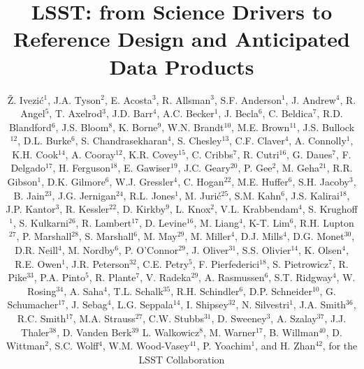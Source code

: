 \documentclass{emulateapj}
\begin{document}
\title{LSST: from Science Drivers to Reference Design and Anticipated Data Products} 

\author{
\v{Z}. Ivezi\'{c}$^1$,
J.A. Tyson$^2$,
E. Acosta$^3$,
R. Allsman$^3$,
S.F. Anderson$^1$,
J. Andrew$^4$,
R. Angel$^5$,
T. Axelrod$^3$,
J.D. Barr$^4$,
A.C. Becker$^1$, 
J. Becla$^6$,  
C. Beldica$^7$,
R.D. Blandford$^6$,
J.S. Bloom$^8$, 
K. Borne$^9$,  
W.N. Brandt$^{10}$,
M.E. Brown$^{11}$,   
J.S. Bullock$^{12}$,   
D.L. Burke$^6$, 
S. Chandrasekharan$^4$,
S. Chesley$^{13}$, 
C.F. Claver$^4$,   
A. Connolly$^1$,
K.H. Cook$^{14}$,
A. Cooray$^{12}$, 
K.R. Covey$^{15}$,    
C. Cribbs$^7$,
R. Cutri$^{16}$,
G. Daues$^7$,
F. Delgado$^{17}$,
H. Ferguson$^{18}$,
E. Gawiser$^{19}$,   
J.C. Geary$^{20}$,
P. Gee$^2$,
M. Geha$^{21}$,
R.R. Gibson$^1$,    
D.K. Gilmore$^6$,     
W.J. Gressler$^4$,
C. Hogan$^{22}$, 
M.E. Huffer$^6$,
S.H. Jacoby$^3$,  
B. Jain$^{23}$,     
J.G. Jernigan$^{24}$,
R.L. Jones$^1$, 
M. Juri\'{c}$^{25}$,
S.M. Kahn$^6$,   
J.S. Kalirai$^{18}$, 
J.P. Kantor$^3$,
R. Kessler$^{22}$,
D. Kirkby$^9$,  
L. Knox$^2$,    
V.L. Krabbendam$^{4}$, 
S. Krughoff$^1$,
S. Kulkarni$^{26}$, 
R. Lambert$^{17}$, 
D. Levine$^{16}$, 
M. Liang$^4$,
K-T. Lim$^6$, 
R.H. Lupton$^{27}$,
P. Marshall$^{28}$,
S. Marshall$^6$, 
M. May$^{29}$,
M. Miller$^4$,
D.J. Mills$^4$,  
D.G. Monet$^{30}$,
D.R. Neill$^4$, 
M. Nordby$^6$,
P. O'Connor$^{29}$,  
J. Oliver$^{31}$,
S.S. Olivier$^{14}$,
K. Olsen$^4$, 
R.E. Owen$^1$, 
J.R. Peterson$^{32}$,
C.E. Petry$^{5}$,  
F. Pierfederici$^{18}$,
S. Pietrowicz$^7$,
R. Pike$^{33}$,
P.A. Pinto$^{5}$,   
R. Plante$^7$,
V. Radeka$^{29}$,   
A. Rasmussen$^6$,
S.T. Ridgway$^4$, 
W. Rosing$^{34}$,
A. Saha$^{4}$,     
T.L. Schalk$^{35}$,     
R.H. Schindler$^6$,
D.P. Schneider$^{10}$,    
G. Schumacher$^{17}$,
J. Sebag$^4$,
L.G. Seppala$^{14}$,
I. Shipsey$^{32}$,
N. Silvestri$^1$,
J.A. Smith$^{36}$,    
R.C. Smith$^{17}$,
M.A. Strauss$^{27}$,     
C.W. Stubbs$^{31}$,
D. Sweeney$^3$,     
A. Szalay$^{37}$,
J.J. Thaler$^{38}$,
D. Vanden Berk$^{39}$  
L. Walkowicz$^8$,
M. Warner$^{17}$,
B. Willman$^{40}$,
D. Wittman$^2$,
S.C. Wolff$^4$, 
W.M. Wood-Vasey$^{41}$,  
P. Yoachim$^1$,
and H. Zhan$^{42}$, 
for the LSST Collaboration
}
\affil{}
\end{document}
